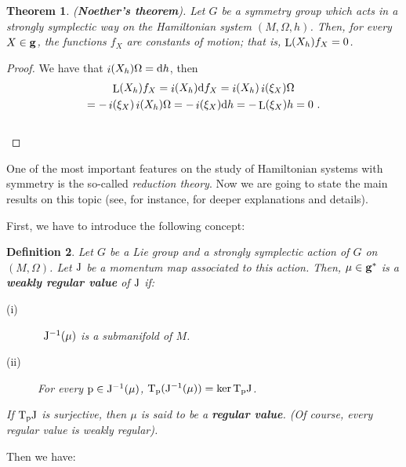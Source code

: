 \documentclass[12pt]{report}
\newtheorem{teor}{Theorem}[chapter]
\newtheorem{definition}[teor]{Definition}
\def\qed{\ifvmode\removelastskip\fi
{\unskip\nobreak\hfil\penalty50\hbox{}\nobreak\hfil
\hbox{\vrule height1.2ex width1.2ex}\parfillskip=0pt
\finalhyphendemerits=0 \par\smallskip}}
\def\d{{\rm d}}
\def\Tan{{\rm T}}
\def\Lie{\mathop{\rm L}\nolimits}
\def\inn{\mathop{i}\nolimits}
\begin{document}
\begin{teor}
({\sl \textbf{Noether's theorem}}).
Let $G$ be a symmetry group which acts in a strongly symplectic way
on the Hamiltonian system $(M,\Omega,h)$.
Then, for every $X \in {\bf g}$, the functions $f_X$
are constants of motion; that is, $\Lie(X_h)f_X = 0$.
\end{teor}
\begin{proof}
We have that $\inn(X_h)\Omega=\d h$, then
\begin{multline*}
    \Lie(X_h)f_X=\inn(X_h)\d f_X 
= \inn(X_h)\inn(\xi_X)\Omega\\
=-\inn(\xi_X)\inn(X_h)\Omega
= -\inn(\xi_X)\d h
=-\Lie(\xi_X)h = 0 \ .
\end{multline*}
\\ \qed  \end{proof}

One of the most important features on the study of
Hamiltonian systems with symmetry is the so-called
{\sl reduction theory}.
Now we are going to state the main results on this topic
(see, for instance, \cite{CM-2009,MMOPR-2007,MR-99,MW-74,MW,Or-2002,OR-2002,OR-2004,We-77} for deeper explanations and details).

First, we have to introduce the following concept:

\begin{definition}
Let $G$ be a Lie group and a strongly symplectic action
of $G$ on $(M,\Omega)$.
Let ${\rm J}$ be a momentum map associated to this action. Then, 
$\mu \in {\bf g}^*$ is a 
\textbf{weakly regular value} of ${\rm J}$ if:
\begin{description}
\item[{\rm (i)}] \
${\rm J}^{-1}(\mu )$ is a submanifold of $M$.
\item[{\rm (ii)}]
For every ${\rm p}\in {\rm J}^{-1}(\mu )$, 
$\Tan_{\rm p}({\rm J}^{-1}(\mu)) = \ker \Tan_{\rm p}{\rm J}$.
\end{description}
If $\Tan_{\rm p}{\rm J}$ is surjective, then $\mu$ is said to be a \textbf{regular value}. 
(Of course,  every regular value is weakly regular).
\end{definition}

Then we have:
\end{document}
